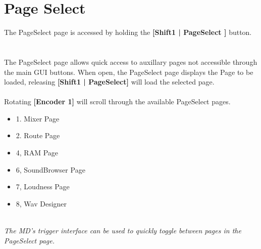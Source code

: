 \chapter{Page Select}
The PageSelect page is accessed by holding the \textbf{[Shift1 | PageSelect ]} button.
\\
\\
\\
The PageSelect page allows quick access to auxillary pages not accessible through the main GUI buttons.
When open, the PageSelect page displays the Page to be loaded, releasing \textbf{[Shift1 | PageSelect]} will load
the selected page.
\\
\\Rotating \textbf{[Encoder 1]} will scroll through the available PageSelect pages.
\begin{itemize}
	\item{1. Mixer Page}
	\item{2. Route Page}
	\item{4, RAM Page}
	\item{6, SoundBrowser Page}
	\item{7, Loudness Page}
    \item{8, Wav Designer}
\end{itemize}
\\
\textit{The MD's trigger interface can be used to quickly toggle between pages in the PageSelect page. }






